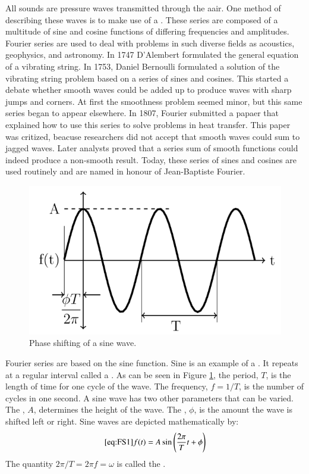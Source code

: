\documentclass[12pt, a4paper, oneside, openright, titlepage]{book}
\begin{document}
All sounds are pressure waves transmitted through the aair. One method of describing these waves is to make use of a . These series are composed of a multitude of sine and cosine functions of differing frequencies and amplitudes. Fourier series are used to deal with problems in such diverse fields as acoustics, geophysics, and astronomy. In 1747 D'Alembert formulated the general equation of a vibrating string. In 1753, Daniel Bernoulli formulated a solution of the vibrating string problem based on a series of sines and cosines. This started a debate whether smooth waves could be added up to produce waves with sharp jumps and corners. At first the smoothness problem seemed minor, but this same series began to appear elsewhere. In 1807, Fourier submitted a papaer that explained how to use this series to solve problems in heat transfer. This paper was critized, beacuse researchers did not accept that smooth waves could sum to jagged waves. Later analysts proved that a series sum of smooth functions could indeed produce a non-smooth result. Today, these series of sines and cosines are used routinely and are named  in honour of Jean-Baptiste Fourier.

\begin{figure}[H]
    \centering
    \includegraphics[scale = 0.8]{Images/FS2.PNG}
    \caption{Phase shifting of a sine wave.}
    \label{fig:FS2}
\end{figure}

Fourier series are based on the sine function. Sine is an example of a . It repeats at a regular interval called a . As can be seen in Figure \ref{fig:FS2}, the period, $T$, is the length of time for one cycle of the wave. The frequency, $f = 1/T$, is the number of cycles in one second. A sine wave has two other parameters that can be varied. The , $A$, determines the height of the wave. The , $\phi$, is the amount the wave is shifted left or right. Sine waves are depicted mathematically by: \begin{equation}\ref{eq:FS1}
    f(t) = A\sin\left(\frac{2\pi}{T}t+\phi\right)
\end{equation}
The quantity $2\pi/T = 2\pi f = \omega$ is called the .
\end{document}
